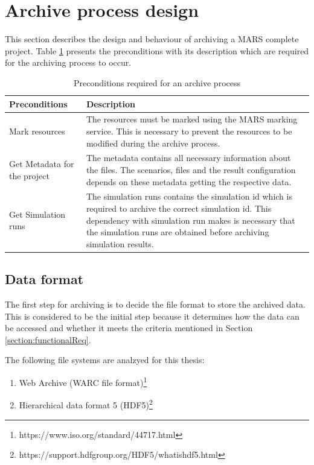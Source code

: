 \section{Archive process design}
This section describes the design and behaviour of archiving a MARS complete project. Table \ref{table:preconditionsArchive} presents the preconditions with its 
description which are required for the archiving process to occur. 

\begin{table}[H]
    \centering
    \begin{tabular}{|p{3cm}|p{11cm}|}
        \hline
            \textbf{Preconditions}  & \textbf{Description}\\
        \hline
            Mark resources & 
            The resources must be marked using the MARS marking service. This is necessary to prevent the resources to be modified during the archive process. \\
        \hline
            Get Metadata for the project
            & The metadata contains all necessary information about the files. The scenarios, files and the result configuration depends on these metadata getting 
            the respective data.\\  
        \hline
            Get Simulation runs & The simulation runs contains the simulation id which is required to archive the correct simulation id. This dependency
            with simulation run makes is necessary that the simulation runs are obtained before archiving simulation results. \\
        \hline
    \end{tabular}
    \caption{Preconditions required for an archive process}
    \label{table:preconditionsArchive}     
\end{table}    

\subsection{Data format}
The first step for archiving is to decide the file format to store the archived data. This is
considered to be the initial step because it determines how the data can be accessed and whether it meets
the criteria mentioned in Section \ref{section:functionalReq}.

\par
The following file systems are analzyed for this thesis:
\begin{enumerate}
    \item Web Archive (WARC file format)\footnote{https://www.iso.org/standard/44717.html}
    \item Hierarchical data format 5 (HDF5)\footnote{https://support.hdfgroup.org/HDF5/whatishdf5.html}
\end{enumerate}

